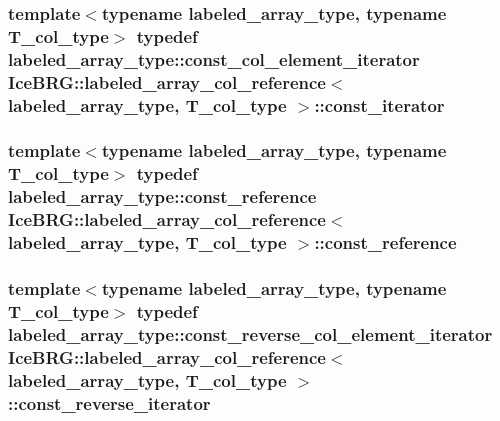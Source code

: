 \subsubsection[{const\+\_\+iterator}]{\setlength{\rightskip}{0pt plus 5cm}template$<$typename labeled\+\_\+array\+\_\+type, typename T\+\_\+col\+\_\+type$>$ typedef labeled\+\_\+array\+\_\+type\+::const\+\_\+col\+\_\+element\+\_\+iterator {\bf Ice\+B\+R\+G\+::labeled\+\_\+array\+\_\+col\+\_\+reference}$<$ labeled\+\_\+array\+\_\+type, T\+\_\+col\+\_\+type $>$\+::{\bf const\+\_\+iterator}}\label{classIceBRG_1_1labeled__array__col__reference_ab7d7f397a1e5f1d9bfc2c61604dda841}
\hypertarget{classIceBRG_1_1labeled__array__col__reference_a2c7ae3d3e5b937e934ad83ea1269127d}{}
\subsubsection[{const\+\_\+reference}]{\setlength{\rightskip}{0pt plus 5cm}template$<$typename labeled\+\_\+array\+\_\+type, typename T\+\_\+col\+\_\+type$>$ typedef labeled\+\_\+array\+\_\+type\+::const\+\_\+reference {\bf Ice\+B\+R\+G\+::labeled\+\_\+array\+\_\+col\+\_\+reference}$<$ labeled\+\_\+array\+\_\+type, T\+\_\+col\+\_\+type $>$\+::{\bf const\+\_\+reference}}\label{classIceBRG_1_1labeled__array__col__reference_a2c7ae3d3e5b937e934ad83ea1269127d}
\hypertarget{classIceBRG_1_1labeled__array__col__reference_af8c36128050cef0220fcf8269ecb86da}{}
\subsubsection[{const\+\_\+reverse\+\_\+iterator}]{\setlength{\rightskip}{0pt plus 5cm}template$<$typename labeled\+\_\+array\+\_\+type, typename T\+\_\+col\+\_\+type$>$ typedef labeled\+\_\+array\+\_\+type\+::const\+\_\+reverse\+\_\+col\+\_\+element\+\_\+iterator {\bf Ice\+B\+R\+G\+::labeled\+\_\+array\+\_\+col\+\_\+reference}$<$ labeled\+\_\+array\+\_\+type, T\+\_\+col\+\_\+type $>$\+::{\bf const\+\_\+reverse\+\_\+iterator}}\label{classIceBRG_1_1labeled__array__col__reference_af8c36128050cef0220fcf8269ecb86da}
\hypertarget{classIceBRG_1_1labeled__array__col__reference_a035a727159f4298ef4f4a360e6bc8aa8}{}
